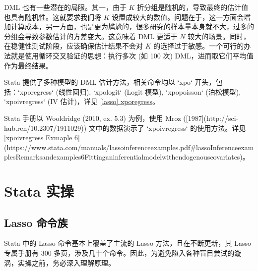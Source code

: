 {DML 也有一些潜在的局限。其一，由于 $K$ 折分组是随机的，导致最终的估计值也具有随机性。这就要求我们将 $K$ 设置成较大的数值。问题在于，这一方面会增加计算成本，另一方面，也是更为尴尬的，很多研究的样本量本身就不大，过多的分组会导致参数估计的方差变大。这意味着 DML 更适于 $N$ 较大的场景。同时，在稳健性测试阶段，应该确保估计结果不会对 $K$ 的选择过于敏感。一个可行的办法就是使用循环交叉验证的思想：执行多次 (如 100 次) DML，进而取它们平均值作为最终结果。


Stata 提供了多种模型的 DML 估计方法，相关命令均以 `xpo` 开头，包括：`xporegress` (线性回归), `xpologit` (Logit 模型), `xpopoisson` (泊松模型), `xpoivregress` (IV 估计)，详见 \href{https://www.stata.com/manuals/lassoxporegress.pdf}{[lasso] xporegress}。

Stata 手册以 Wooldridge (2010, ex. 5.3) 为例，使用 Mroz ([1987](http://sci-hub.ren/10.2307/1911029)) 文中的数据演示了 `xpoivregress` 的使用方法。详见 
[xpoivregress Exmaple 6](https://www.stata.com/manuals/lassoinferenceexamples.pdf#lassoInferenceexamplesRemarksandexamples6Fittinganinferentialmodelwithendogenouscovariates)。





















\section{Stata 实操}

\subsection{Lasso 命令族}
Stata 中的 Lasso 命令基本上覆盖了主流的 Lasso 方法，且在不断更新，其 Lasso 专属手册有 300 多页，涉及几十个命令。因此，为避免陷入各种盲目尝试的漩涡，实操之前，务必深入理解原理。

}
